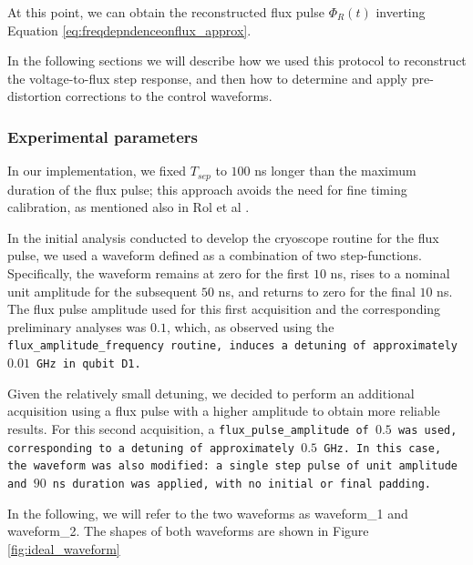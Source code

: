 At this point, we can obtain the reconstructed flux pulse $\Phi_R(t)$ inverting Equation \ref{eq:freqdepndenceonflux_approx}.

In the following sections we will describe how we used this protocol to reconstruct the voltage-to-flux step response, and then how to determine and apply pre-distortion corrections to the control waveforms.

\subsubsection{Experimental parameters}
In our implementation, we fixed $T_{sep}$ to $100$ ns longer than the maximum duration of the flux pulse; this approach avoids the need for fine timing calibration, as mentioned also in Rol et al \cite{rol_time-domain_2020}.

In the initial analysis conducted to develop the cryoscope routine for the flux pulse, we used a waveform defined as a combination of two step-functions. 
Specifically, the waveform remains at zero for the first $10$ ns, rises to a nominal unit amplitude for the subsequent $50$ ns, and returns to zero for the final $10$ ns.\\
The flux pulse amplitude used for this first acquisition and the corresponding preliminary analyses was $0.1$, which, as observed using the \tt{flux\_amplitude\_frequency} routine, induces a detuning of approximately $0.01$ GHz in qubit \tt{D1}. 

Given the relatively small detuning, we decided to perform an additional acquisition using a flux pulse with a higher amplitude to obtain more reliable results.
For this second acquisition, a \tt{flux\_pulse\_amplitude} of $0.5$ was used, corresponding to a detuning of approximately $0.5$ GHz. 
In this case, the waveform was also modified: a single step pulse of unit amplitude and $90$ ns duration was applied, with no initial or final padding.

In the following, we will refer to the two waveforms as waveform\_1 and waveform\_2. 
The shapes of both waveforms are shown in Figure \ref{fig:ideal_waveform}

